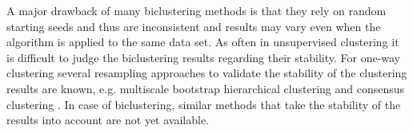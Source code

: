 A major drawback of many biclustering methods is that they rely on random starting seeds and thus are inconsistent and results may vary even when the algorithm is applied to the same data set. As often in unsupervised clustering it is difficult to judge the biclustering results regarding their stability. For one-way clustering several resampling approaches to validate the stability of the clustering results are known, e.g. %
multiscale bootstrap hierarchical clustering \cite{Suzuki2006} and consensus clustering \cite{Monti2003}. In case of biclustering, similar methods that take the stability of the results into account are not yet available. 

